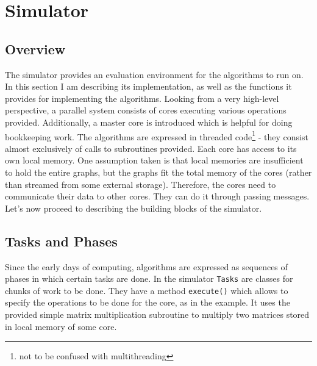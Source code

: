 \documentclass[12pt,a4paper,twoside,openright]{report}
\begin{document}

\section{Simulator}
\subsection{Overview}
The simulator provides an evaluation environment for the algorithms to run on. In this section I am describing its implementation, as well as the functions it provides for implementing the algorithms. Looking from a very high-level perspective, a parallel system consists of cores executing various operations provided. Additionally, a master core is introduced which is helpful for doing bookkeeping work.
The algorithms are expressed in threaded code\footnote{not to be confused with multithreading} - they consist almost exclusively of calls to subroutines provided. Each core has access to its own local memory. One assumption taken is that local memories are insufficient to hold the entire graphs, but the graphs fit the total memory of the cores (rather than streamed from some external storage). Therefore, the cores need to communicate their data to other cores. They can do it through passing messages. Let's now proceed to describing the building blocks of the simulator.

\subsection{Tasks and Phases}
Since the early days of computing, algorithms are expressed as sequences of phases in which certain tasks are done. In the simulator \texttt{Tasks} are classes for chunks of work to be done. They have a method \texttt{execute()} which allows to specify the operations to be done for the core, as in the example. It uses the provided simple matrix multiplication subroutine to multiply two matrices stored in local memory of some core. 
\end{document}
